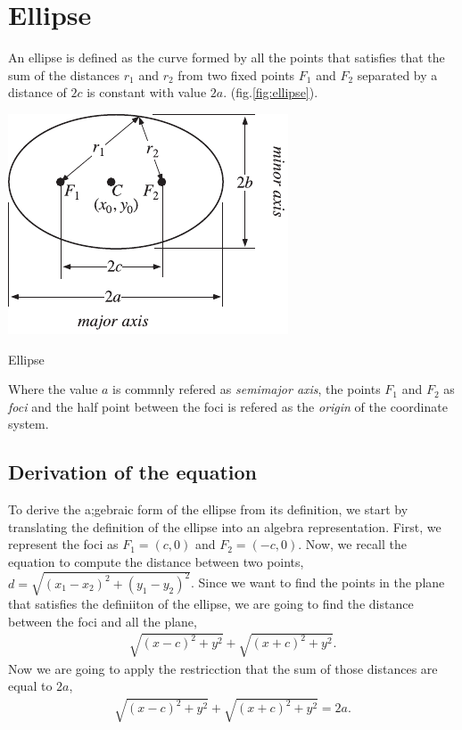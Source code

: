 \documentclass[../main-notes.tex]{subfiles}
\begin{document}
\section{Ellipse}

An ellipse is defined as the curve formed by all the points that satisfies that the sum of the distances $r_1$ and $r_2$ from two fixed points $F_1$ and $F_2$ separated by a distance of $2c$ is constant with value $2a$. (fig.\ref{fig:ellipse}).
\begin{marginfigure}
    \centering
    \includegraphics[width=\textwidth]{../Figures/ellipse/EllipseBipolar_700.pdf}
    \caption{Ellipse}\label{fig:ellipse}
\end{marginfigure}
Where the value $a$ is commnly refered as \textit{semimajor axis}, the points $F_1$ and $F_2$ as \textit{foci} and the half point between the foci is refered as the \textit{origin} of the coordinate system.

\subsection{Derivation of the equation}

To derive the a;gebraic form of the ellipse from its definition, we start by translating the definition of the ellipse into an algebra representation.
First, we represent the foci as $F_1=(c,0)$ and $F_2=(-c,0)$.
Now, we recall the equation to compute the distance between two points, $d=\sqrt{(x_1-x_2)^2+(y_1-y_2)^2}$.
Since we want to find the points in the plane that satisfies the definiiton of the ellipse, we are going to find the distance between the foci and all the plane,
\begin{gather*}
    \sqrt{(x-c)^2+y^2} + \sqrt{(x+c)^2+y^2}.
\end{gather*}
Now we are going to apply the restricction that the sum of those distances are equal to $2a$,
\begin{gather*}
    \sqrt{(x-c)^2+y^2} + \sqrt{(x+c)^2+y^2} = 2a.
\end{gather*}
\end{document}
